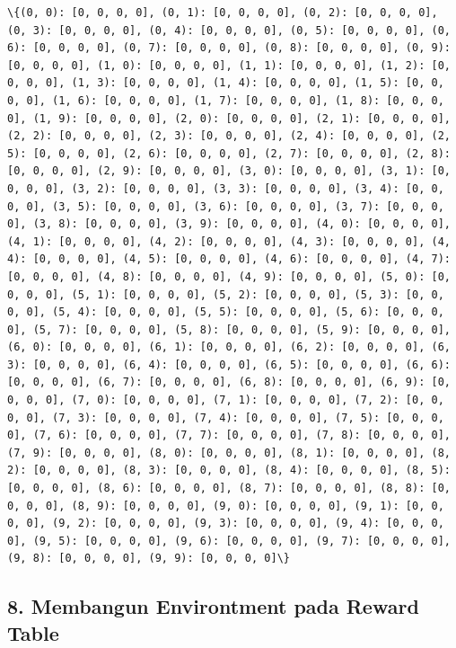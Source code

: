 \documentclass[11pt]{article}
\begin{document}
    \begin{Verbatim}[commandchars=\\\{\}]
\{(0, 0): [0, 0, 0, 0], (0, 1): [0, 0, 0, 0], (0, 2): [0, 0, 0, 0], (0, 3): [0, 0, 0, 0], (0, 4): [0, 0, 0, 0], (0, 5): [0, 0, 0, 0], (0, 6): [0, 0, 0, 0], (0, 7): [0, 0, 0, 0], (0, 8): [0, 0, 0, 0], (0, 9): [0, 0, 0, 0], (1, 0): [0, 0, 0, 0], (1, 1): [0, 0, 0, 0], (1, 2): [0, 0, 0, 0], (1, 3): [0, 0, 0, 0], (1, 4): [0, 0, 0, 0], (1, 5): [0, 0, 0, 0], (1, 6): [0, 0, 0, 0], (1, 7): [0, 0, 0, 0], (1, 8): [0, 0, 0, 0], (1, 9): [0, 0, 0, 0], (2, 0): [0, 0, 0, 0], (2, 1): [0, 0, 0, 0], (2, 2): [0, 0, 0, 0], (2, 3): [0, 0, 0, 0], (2, 4): [0, 0, 0, 0], (2, 5): [0, 0, 0, 0], (2, 6): [0, 0, 0, 0], (2, 7): [0, 0, 0, 0], (2, 8): [0, 0, 0, 0], (2, 9): [0, 0, 0, 0], (3, 0): [0, 0, 0, 0], (3, 1): [0, 0, 0, 0], (3, 2): [0, 0, 0, 0], (3, 3): [0, 0, 0, 0], (3, 4): [0, 0, 0, 0], (3, 5): [0, 0, 0, 0], (3, 6): [0, 0, 0, 0], (3, 7): [0, 0, 0, 0], (3, 8): [0, 0, 0, 0], (3, 9): [0, 0, 0, 0], (4, 0): [0, 0, 0, 0], (4, 1): [0, 0, 0, 0], (4, 2): [0, 0, 0, 0], (4, 3): [0, 0, 0, 0], (4, 4): [0, 0, 0, 0], (4, 5): [0, 0, 0, 0], (4, 6): [0, 0, 0, 0], (4, 7): [0, 0, 0, 0], (4, 8): [0, 0, 0, 0], (4, 9): [0, 0, 0, 0], (5, 0): [0, 0, 0, 0], (5, 1): [0, 0, 0, 0], (5, 2): [0, 0, 0, 0], (5, 3): [0, 0, 0, 0], (5, 4): [0, 0, 0, 0], (5, 5): [0, 0, 0, 0], (5, 6): [0, 0, 0, 0], (5, 7): [0, 0, 0, 0], (5, 8): [0, 0, 0, 0], (5, 9): [0, 0, 0, 0], (6, 0): [0, 0, 0, 0], (6, 1): [0, 0, 0, 0], (6, 2): [0, 0, 0, 0], (6, 3): [0, 0, 0, 0], (6, 4): [0, 0, 0, 0], (6, 5): [0, 0, 0, 0], (6, 6): [0, 0, 0, 0], (6, 7): [0, 0, 0, 0], (6, 8): [0, 0, 0, 0], (6, 9): [0, 0, 0, 0], (7, 0): [0, 0, 0, 0], (7, 1): [0, 0, 0, 0], (7, 2): [0, 0, 0, 0], (7, 3): [0, 0, 0, 0], (7, 4): [0, 0, 0, 0], (7, 5): [0, 0, 0, 0], (7, 6): [0, 0, 0, 0], (7, 7): [0, 0, 0, 0], (7, 8): [0, 0, 0, 0], (7, 9): [0, 0, 0, 0], (8, 0): [0, 0, 0, 0], (8, 1): [0, 0, 0, 0], (8, 2): [0, 0, 0, 0], (8, 3): [0, 0, 0, 0], (8, 4): [0, 0, 0, 0], (8, 5): [0, 0, 0, 0], (8, 6): [0, 0, 0, 0], (8, 7): [0, 0, 0, 0], (8, 8): [0, 0, 0, 0], (8, 9): [0, 0, 0, 0], (9, 0): [0, 0, 0, 0], (9, 1): [0, 0, 0, 0], (9, 2): [0, 0, 0, 0], (9, 3): [0, 0, 0, 0], (9, 4): [0, 0, 0, 0], (9, 5): [0, 0, 0, 0], (9, 6): [0, 0, 0, 0], (9, 7): [0, 0, 0, 0], (9, 8): [0, 0, 0, 0], (9, 9): [0, 0, 0, 0]\}

    \end{Verbatim}

    \subsection{8. Membangun Environtment pada Reward
Table}\label{membangun-environtment-pada-reward-table}
\end{document}
